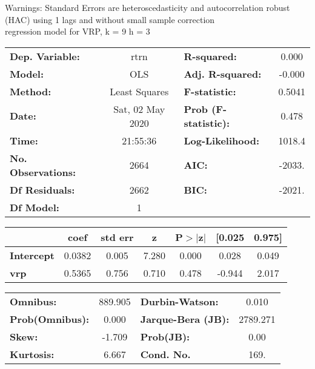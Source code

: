Warnings: \newline
 [1] Standard Errors are heteroscedasticity and autocorrelation robust (HAC) using 1 lags and without small sample correction\\ 

regression model for VRP, k = 9 h = 3\begin{center}
\begin{tabular}{lclc}
\toprule
\textbf{Dep. Variable:}    &       rtrn       & \textbf{  R-squared:         } &     0.000   \\
\textbf{Model:}            &       OLS        & \textbf{  Adj. R-squared:    } &    -0.000   \\
\textbf{Method:}           &  Least Squares   & \textbf{  F-statistic:       } &    0.5041   \\
\textbf{Date:}             & Sat, 02 May 2020 & \textbf{  Prob (F-statistic):} &    0.478    \\
\textbf{Time:}             &     21:55:36     & \textbf{  Log-Likelihood:    } &    1018.4   \\
\textbf{No. Observations:} &        2664      & \textbf{  AIC:               } &    -2033.   \\
\textbf{Df Residuals:}     &        2662      & \textbf{  BIC:               } &    -2021.   \\
\textbf{Df Model:}         &           1      & \textbf{                     } &             \\
\bottomrule
\end{tabular}
\begin{tabular}{lcccccc}
                   & \textbf{coef} & \textbf{std err} & \textbf{z} & \textbf{P$> |$z$|$} & \textbf{[0.025} & \textbf{0.975]}  \\
\midrule
\textbf{Intercept} &       0.0382  &        0.005     &     7.280  &         0.000        &        0.028    &        0.049     \\
\textbf{vrp}       &       0.5365  &        0.756     &     0.710  &         0.478        &       -0.944    &        2.017     \\
\bottomrule
\end{tabular}
\begin{tabular}{lclc}
\textbf{Omnibus:}       & 889.905 & \textbf{  Durbin-Watson:     } &    0.010  \\
\textbf{Prob(Omnibus):} &   0.000 & \textbf{  Jarque-Bera (JB):  } & 2789.271  \\
\textbf{Skew:}          &  -1.709 & \textbf{  Prob(JB):          } &     0.00  \\
\textbf{Kurtosis:}      &   6.667 & \textbf{  Cond. No.          } &     169.  \\
\bottomrule
\end{tabular}
\end{center}

